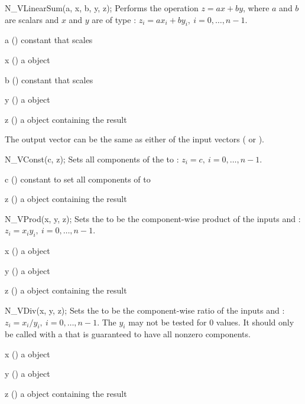 {
  N\_VLinearSum(a, x, b, y, z);
}
{
  Performs the operation $z = a x + b y$, where $a$ and $b$ are 
  scalars and $x$ and $y$ are of type :
  $z_i = a x_i + b y_i, \: i=0,\ldots,n-1$.
}
{
  \begin{args}[a]
  \item[a] () constant that scales 
  \item[x] () a {\nvector} object
  \item[b] () constant that scales 
  \item[y] () a {\nvector} object
  \item[z] () a {\nvector} object containing the result
  \end{args}
}
{
  The output vector  can be the same as either of the input vectors ( or ).
}
{}

{
  N\_VConst(c, z);
}
{
  Sets all components of the   to  :
  $z_i = c,\: i=0,\ldots,n-1$.
}
{
  \begin{args}[c]
  \item[c] () constant to set all components of  to
  \item[z] () a {\nvector} object containing the result
  \end{args}
}
{}
{}

{
  N\_VProd(x, y, z);
}
{
  Sets the   to be the component-wise product of the
   inputs  and : $z_i = x_i y_i,\: i=0,\ldots,n-1$.
}
{
  \begin{args}[x]
  \item[x] () a {\nvector} object
  \item[y] () a {\nvector} object
  \item[z] () a {\nvector} object containing the result
  \end{args}
}
{}
{}

{
  N\_VDiv(x, y, z);
}
{
  Sets the   to be the component-wise ratio of the
   inputs  and :
  $z_i = x_i / y_i,\: i=0,\ldots,n-1$. The $y_i$ may not be tested
  for $0$ values. It should only be called with a  that is
  guaranteed to have all nonzero components.
}
{
  \begin{args}[x]
  \item[x] () a {\nvector} object
  \item[y] () a {\nvector} object
  \item[z] () a {\nvector} object containing the result
  \end{args}
}
{}
{}

